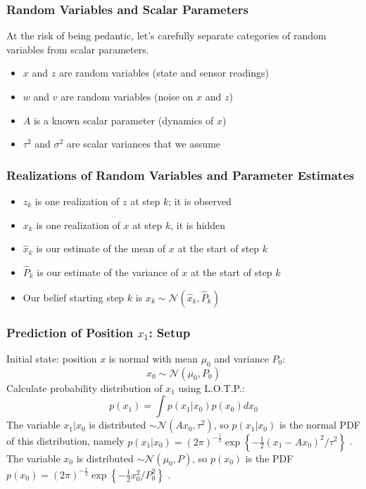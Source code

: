 \documentclass{beamer}
\newcommand{\N}{\mathcal{N}}
\newcommand{\half}{\frac{1}{2}}
\newcommand{\lb}{\left\lbrace}
\newcommand{\rb}{\right\rbrace}
\newcommand{\xh}{\hat{x}}
\newcommand{\Ph}{\hat{P}}
\begin{document}
\begin{frame}
\frametitle{Random Variables and Scalar Parameters}
At the risk of being pedantic, let's carefully separate categories of random variables from scalar parameters.
\begin{itemize}
\item $x$ and $z$ are random variables (state and sensor readings)
\item $w$ and $v$ are random variables (noise on $x$ and $z$)
\item $A$ is a known scalar parameter (dynamics of $x$)
\item $\tau^2$ and $\sigma^2$ are scalar variances that we assume
\end{itemize}
\end{frame}

\begin{frame}
\frametitle{Realizations of Random Variables and Parameter Estimates}
\begin{itemize}
\item $z_k$ is one realization of $z$ at step $k$; it is observed
\item $x_k$ is one realization of $x$ at step $k$, it is hidden
\item $\xh_k$ is our estimate of the mean of $x$ at the start of step $k$
\item $\Ph_k$ is our estimate of the variance of $x$ at the start of step $k$
\item Our belief starting step $k$ is $x_k \sim \N(\xh_k, \Ph_k)$
\end{itemize}
\end{frame}

\begin{frame}
\frametitle{Prediction of Position $x_1$: Setup}
Initial state: position  $x$ is normal with mean $\mu_0$ and variance $P_0$:
\[ x_0 \sim \N(\mu_0, P_0) \]
Calculate probability distribution of $x_1$ using L.O.T.P.:
\[ p(x_1) = \int p(x_1|x_0) p(x_0) dx_0 \]
The variable $x_1 |x_0$ is distributed $\sim \N(A x_0, \tau^2)$,
so $p(x_1|x_0)$ is the normal PDF of this distribution, namely
$p(x_1|x_0) = (2\pi)^{-\half} \exp \lb -\half (x_1 - A x_0)^2 / \tau^2 \rb$
. \\ \smallskip
The variable $x_0$ is distributed $\sim \N(\mu_0, P)$, so $p(x_0)$ is the PDF 
$p(x_0) = (2\pi)^{-\half} \exp \lb -\half x_0^2 / P_0^2 \rb$ . \\
\end{frame}
\end{document}
